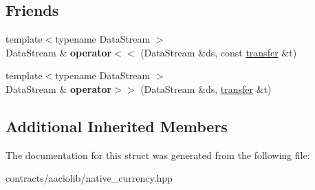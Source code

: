 \subsection*{Friends}
\begin{DoxyCompactItemize}
\item 
\mbox{\label{structaacio_1_1native__currency_1_1transfer_aadac42091a1b9322cfef489201d9e355}} 
{\footnotesize template$<$typename Data\+Stream $>$ }\\Data\+Stream \& {\bfseries operator$<$$<$} (Data\+Stream \&ds, const \mbox{\hyperlink{structaacio_1_1native__currency_1_1transfer}{transfer}} \&t)
\item 
\mbox{\label{structaacio_1_1native__currency_1_1transfer_a32034f53b76adb3292cb4c5a9c08ab38}} 
{\footnotesize template$<$typename Data\+Stream $>$ }\\Data\+Stream \& {\bfseries operator$>$$>$} (Data\+Stream \&ds, \mbox{\hyperlink{structaacio_1_1native__currency_1_1transfer}{transfer}} \&t)
\end{DoxyCompactItemize}
\subsection*{Additional Inherited Members}


The documentation for this struct was generated from the following file\+:\begin{DoxyCompactItemize}
\item 
contracts/aaciolib/native\+\_\+currency.\+hpp\end{DoxyCompactItemize}

